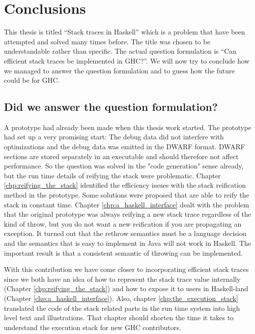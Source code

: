 \chapter{Conclusions}

This thesis is titled ``Stack traces in Haskell'' which is a problem
that have been attempted and solved many times before. The title was
chosen to be understandable rather than specific. The actual question
formulation is ``Can efficient stack traces be implemented in GHC?''.
We will now try to conclude how we managed to answer the question
formulation and to guess how the future could be for GHC.

\section{Did we answer the question formulation?}

A prototype had already been made when this thesis work started. The
prototype had set up a very promising start: The debug data did not
interfere with optimizations and the debug data was emitted in the DWARF
format. DWARF sections are stored separately in an executable and should
therefore not affect performance. So the question was solved in the
"code generation" sense already, but the run time details of reifying
the stack were problematic. Chapter \ref{chp:reifying_the_stack}
identified the efficiency issues with the stack reification method in
the prototype. Some solutions were proposed that are able to reify the
stack in constant time. Chapter \ref{chp:a_haskell_interface} dealt
with the problem that the original prototype was always reifying a new
stack trace regardless of the kind of throw, but you do not want a new
reification if you are propagating an exception. It turned out that the
rethrow semantics must be a language decision and the semantics that is
easy to implement in Java will not work in Haskell. The important
result is that a consistent semantic of throwing can be implemented.

With this contribution we have come closer to incorporating
efficient stack traces since we both have an idea of how
to represent the stack trace value internally (Chapter
\ref{chp:reifying_the_stack}) and how to expose it to users in
Haskell-land (Chapter \ref{chp:a_haskell_interface}). Also, chapter
\ref{chp:the_execution_stack} translated the code of the stack related
parts in the run time system into high level text and illustrations.
That chapter should shorten the time it takes to understand the
execution stack for new GHC contributors.

